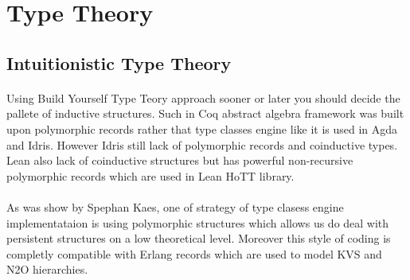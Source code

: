 \documentclass[11pt,oneside]{article}
\begin{document}
\begingroup
\parbox[t][][l]{0.40\textwidth}{

\begin{prooftree}
\end{prooftree}

\begin{prooftree}
\end{prooftree}

}
\hspace{0.1cm}
\parbox[t][][r]{0.60\textwidth}{


\begin{prooftree}
\end{prooftree}

}
\endgroup


\newpage
\section{Type Theory}

\subsection{Intuitionistic Type Theory}

\paragraph{}
Using Build Yourself Type Teory approach sooner or later
you should decide the pallete of inductive structures. Such in Coq
abstract algebra framework was built upon polymorphic records\cite{coqalg} rather
that type classes engine like it is used in Agda and Idris. However
Idris still lack of polymorphic records and coinductive types. Lean also
lack of coinductive structures but has powerful non-recursive polymorphic records
which are used in Lean HoTT library.

\paragraph{}
As was show by Spephan Kaes\cite{kaes}, one of strategy of type clasess engine
implementataion is using polymorphic structures which allows us do deal with
persistent structures on a low theoretical level. Moreover this style of coding
is completly compatible with Erlang records which are used to model KVS and N2O hierarchies.
\end{document}
